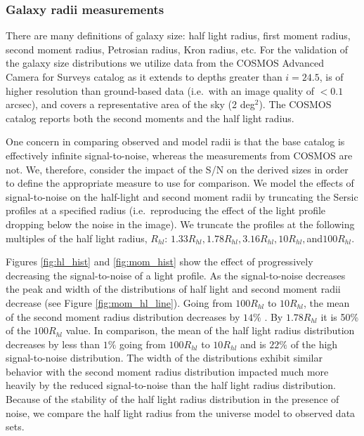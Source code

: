\documentclass[11pt]{article}
\begin{document}
\subsubsection{Galaxy radii measurements}
There are many definitions of galaxy size: half light radius, first
moment radius, second moment radius, Petrosian radius, Kron radius,
etc.  For the validation of the galaxy size distributions we utilize
data from the COSMOS Advanced Camera for Surveys catalog
\citep{cosmos} as it extends to depths greater than $i=24.5$, is of
higher resolution than ground-based data (i.e.\ with an image quality
of $<0.1$ arcsec), and covers a representative area of the sky (2
deg$^2$). The COSMOS catalog reports both the second moments and the
half light radius.

One concern in comparing observed and model radii is that the base
catalog is effectively infinite signal-to-noise, whereas the
measurements from COSMOS are not.  We, therefore, consider the impact
of the S/N on the derived sizes in order to define the appropriate
measure to use for comparison. We model the effects of signal-to-noise
on the half-light and second moment radii by truncating the Sersic
profiles at a specified radius (i.e.\ reproducing the effect of the
light profile dropping below the noise in the image).  We truncate the
profiles at the following multiples of the half light radius,
$R_{hl}$: $1.33R_{hl}, 1.78R_{hl}, 3.16R_{hl}, 10R_{hl},
$and$100R_{hl}$.

Figures \ref{fig:hl_hist} and \ref{fig:mom_hist} show the effect of
progressively decreasing the signal-to-noise of a light profile.  As
the signal-to-noise decreases the peak and width of the distributions
of half light and second moment radii decrease (see Figure
\ref{fig:mom_hl_line}).  Going from $100R_{hl}$ to $10R_{hl}$, the
mean of the second moment radius distribution decreases by $14\%$ . By
$1.78R_{hl}$ it is 50\% of the $100R_{hl}$ value.  In comparison, the
mean of the half light radius distribution decreases by less than
$1\%$ going from $100R_{hl}$ to $10R_{hl}$ and is $22\%$ of the high
signal-to-noise distribution.  The width of the distributions exhibit
similar behavior with the second moment radius distribution impacted
much more heavily by the reduced signal-to-noise than the half light
radius distribution.  Because of the stability of the half light
radius distribution in the presence of noise, we compare the half
light radius from the universe model to observed data sets.
\end{document}
